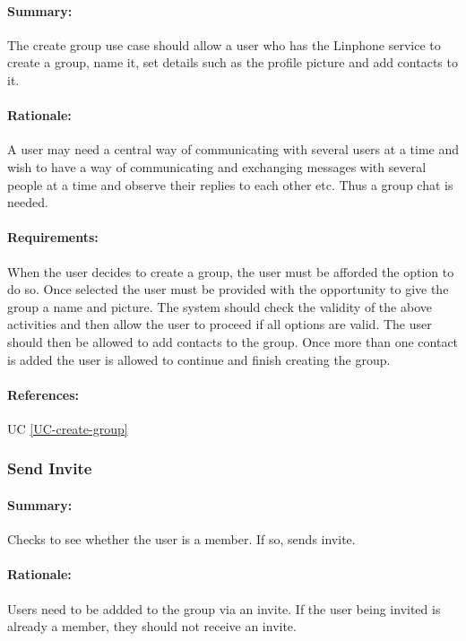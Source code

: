 \documentclass[11pt]{article}
\begin{document}
\paragraph{Summary:} The create group use case should allow a user who has the Linphone service to create a group, name it, set details such as the profile picture and add contacts to it.
\paragraph{Rationale:} A user may need a central way of communicating with several users at a time and wish to have a way of communicating and exchanging messages with several people at a time and observe their replies to each other etc. Thus a group chat is needed.
\paragraph{Requirements:} When the user decides to create a group, the user must be afforded the option to do so. Once selected the user must be provided with the opportunity to give the group a name and picture. The system should check the validity of the above activities and then allow the user to proceed if all options are valid. The user should then be allowed to add contacts to the group. Once more than one contact is added the user is allowed to continue and finish creating the group.
\paragraph{References:} UC \ref{UC-create-group}

\subsubsection{Send Invite} \label{FR-invite}
\paragraph{Summary:} Checks to see whether the user is a member. If so, sends invite.
\paragraph{Rationale:} Users need to be addded to the group via an invite. If the user being invited is already a member, they should not receive an invite.
\end{document}
